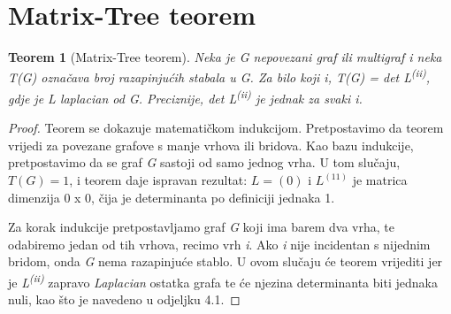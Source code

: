 \documentclass[times, utf8, zavrsni]{fer}
\newtheorem{theorem}{Teorem}[section]
\begin{document}
\section{Matrix-Tree teorem}

\begin{theorem}[Matrix-Tree teorem]
Neka je G nepovezani graf ili multigraf i neka T(G) označava broj razapinjućih stabala u G. Za bilo koji i, T(G) = det L\textsuperscript{(ii)}, gdje je L laplacian od G. Preciznije, det L\textsuperscript{(ii)} je jednak za svaki i.
\end{theorem}

\begin{proof}
Teorem se dokazuje matematičkom indukcijom. Pretpostavimo da teorem vrijedi za povezane grafove s manje vrhova ili bridova. Kao bazu indukcije, pretpostavimo da se graf \textit{G} sastoji od samo jednog vrha. U tom slučaju, $T(G) = 1$, i teorem daje ispravan rezultat: $L = (0)$ i $L^{(11)}$ je matrica dimenzija 0 x 0, čija je determinanta po definiciji jednaka 1.

Za korak indukcije pretpostavljamo graf \textit{G} koji ima barem dva vrha, te odabiremo jedan od tih vrhova, recimo vrh \textit{i}. Ako \textit{i} nije incidentan s nijednim bridom, onda \textit{G} nema razapinjuće stablo. U ovom slučaju će teorem vrijediti jer je \textit{L\textsuperscript{(ii)}} zapravo \textit{Laplacian} ostatka grafa te će njezina determinanta biti jednaka nuli, kao što je navedeno u odjeljku 4.1.


\end{proof}
\end{document}
